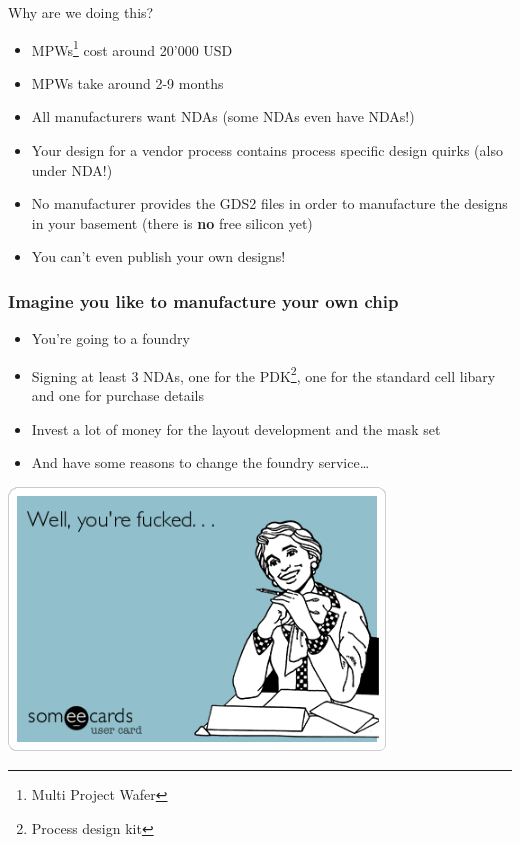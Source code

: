 \documentclass{beamer}
\begin{document}
\begin{frame}{Why are we doing this?}
	\begin{itemize}
		\item MPWs\footnote{Multi Project Wafer} cost around 20'000 USD
		\item MPWs take around 2-9 months
		\item All manufacturers want NDAs (some NDAs even have NDAs!)
		\item Your design for a vendor process contains process specific design quirks (also under NDA!)
		\item No manufacturer provides the GDS2 files in order to manufacture the designs in your basement (there is \textbf{no} free silicon yet)
		\item You can't even publish your own designs!
	\end{itemize}
\end{frame}

\begin{frame}
	\frametitle{Imagine you like to manufacture your own chip}
	\begin{itemize}
		\item You're going to a foundry
		\item Signing at least 3 NDAs, one for the PDK\footnote{Process design kit}, one for the standard cell libary and one for purchase details
		\item Invest a lot of money for the layout development and the mask set
		\item And have some reasons to change the foundry service\dots
	\end{itemize}
\end{frame}

\begin{frame}
	\centering
	\includegraphics[width=0.75\textwidth]{youre-fucked.png}
\end{frame}
\end{document}
